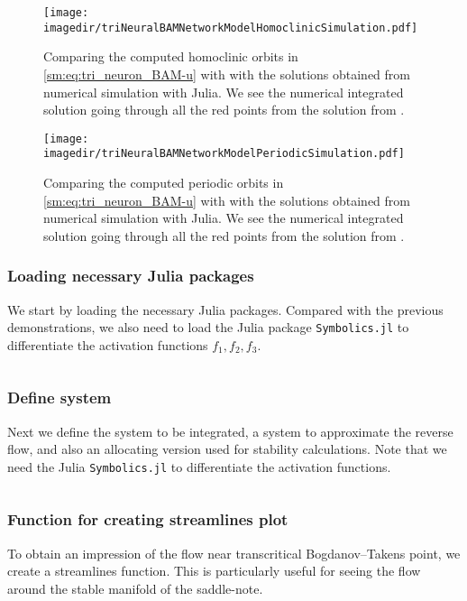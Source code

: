 \begin{figure}[ht]
    \texttt{[image: \\imagedir/triNeuralBAMNetworkModelHomoclinicSimulation.pdf]}
    \caption{Comparing the computed homoclinic orbits in \cref{sm:eq:tri_neuron_BAM-u}
    with \DDEBIFTOOL with the solutions obtained from numerical simulation with Julia.
    We see the numerical integrated solution
    going through all the red points from the solution from \DDEBIFTOOL.}
    \label{sm:fig:triNeuralBAMNetworkSimulationHomoclinic}
\end{figure}

\begin{figure}[ht]
    \texttt{[image: \\imagedir/triNeuralBAMNetworkModelPeriodicSimulation.pdf]}
    \caption{Comparing the computed periodic orbits in \cref{sm:eq:tri_neuron_BAM-u}
    with \DDEBIFTOOL with the solutions obtained from numerical simulation with Julia.
    We see the numerical integrated solution
    going through all the red points from the solution from \DDEBIFTOOL.}
    \label{sm:fig:triNeuralBAMNetworkSimulationPeriodic}
\end{figure}

\subsubsection{Loading necessary Julia packages}
We start by loading the necessary Julia packages. Compared with the previous
demonstrations, we also need to load the Julia package {\tt Symbolics.jl} \cite{Symbolics.jl} to
differentiate the activation functions $f_1,f_2,f_3$.
\inputminted[firstline=1, lastline=9]{julia}{\pathToJuliaFiles/triNeuralBAMNetworkModel_simulation_article.jl}

\subsubsection{Define system}
Next we define the system to be integrated, a system to approximate the reverse
flow, and also an allocating version used for stability calculations. Note that
we need the Julia {\tt Symbolics.jl} to differentiate the activation functions.
\inputminted[firstline=11, lastline=63]{julia}{\pathToJuliaFiles/triNeuralBAMNetworkModel_simulation_article.jl}

\subsubsection{Function for creating streamlines plot}
To obtain an impression of the flow near transcritical Bogdanov--Takens point,
we create a streamlines function. This is particularly useful for seeing the
flow around the stable manifold of the saddle-note.
\inputminted[firstline=65, lastline=77]{julia}{\pathToJuliaFiles/triNeuralBAMNetworkModel_simulation_article.jl}


